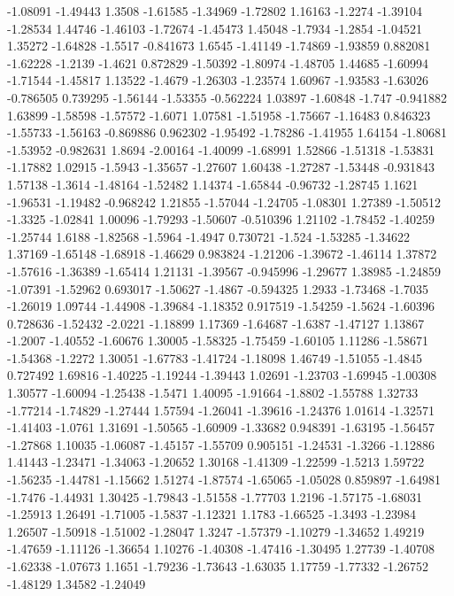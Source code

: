 \documentclass[9pt]{article}
\theoremstyle{plain}
\theoremstyle{definition}
\theoremstyle{remark}
\numberwithin{equation}{section}
\begin{document}
-1.08091
-1.49443
1.3508
-1.61585
-1.34969
-1.72802
1.16163
-1.2274
-1.39104
-1.28534
1.44746
-1.46103
-1.72674
-1.45473
1.45048
-1.7934
-1.2854
-1.04521
1.35272
-1.64828
-1.5517
-0.841673
1.6545
-1.41149
-1.74869
-1.93859
0.882081
-1.62228
-1.2139
-1.4621
0.872829
-1.50392
-1.80974
-1.48705
1.44685
-1.60994
-1.71544
-1.45817
1.13522
-1.4679
-1.26303
-1.23574
1.60967
-1.93583
-1.63026
-0.786505
0.739295
-1.56144
-1.53355
-0.562224
1.03897
-1.60848
-1.747
-0.941882
1.63899
-1.58598
-1.57572
-1.6071
1.07581
-1.51958
-1.75667
-1.16483
0.846323
-1.55733
-1.56163
-0.869886
0.962302
-1.95492
-1.78286
-1.41955
1.64154
-1.80681
-1.53952
-0.982631
1.8694
-2.00164
-1.40099
-1.68991
1.52866
-1.51318
-1.53831
-1.17882
1.02915
-1.5943
-1.35657
-1.27607
1.60438
-1.27287
-1.53448
-0.931843
1.57138
-1.3614
-1.48164
-1.52482
1.14374
-1.65844
-0.96732
-1.28745
1.1621
-1.96531
-1.19482
-0.968242
1.21855
-1.57044
-1.24705
-1.08301
1.27389
-1.50512
-1.3325
-1.02841
1.00096
-1.79293
-1.50607
-0.510396
1.21102
-1.78452
-1.40259
-1.25744
1.6188
-1.82568
-1.5964
-1.4947
0.730721
-1.524
-1.53285
-1.34622
1.37169
-1.65148
-1.68918
-1.46629
0.983824
-1.21206
-1.39672
-1.46114
1.37872
-1.57616
-1.36389
-1.65414
1.21131
-1.39567
-0.945996
-1.29677
1.38985
-1.24859
-1.07391
-1.52962
0.693017
-1.50627
-1.4867
-0.594325
1.2933
-1.73468
-1.7035
-1.26019
1.09744
-1.44908
-1.39684
-1.18352
0.917519
-1.54259
-1.5624
-1.60396
0.728636
-1.52432
-2.0221
-1.18899
1.17369
-1.64687
-1.6387
-1.47127
1.13867
-1.2007
-1.40552
-1.60676
1.30005
-1.58325
-1.75459
-1.60105
1.11286
-1.58671
-1.54368
-1.2272
1.30051
-1.67783
-1.41724
-1.18098
1.46749
-1.51055
-1.4845
0.727492
1.69816
-1.40225
-1.19244
-1.39443
1.02691
-1.23703
-1.69945
-1.00308
1.30577
-1.60094
-1.25438
-1.5471
1.40095
-1.91664
-1.8802
-1.55788
1.32733
-1.77214
-1.74829
-1.27444
1.57594
-1.26041
-1.39616
-1.24376
1.01614
-1.32571
-1.41403
-1.0761
1.31691
-1.50565
-1.60909
-1.33682
0.948391
-1.63195
-1.56457
-1.27868
1.10035
-1.06087
-1.45157
-1.55709
0.905151
-1.24531
-1.3266
-1.12886
1.41443
-1.23471
-1.34063
-1.20652
1.30168
-1.41309
-1.22599
-1.5213
1.59722
-1.56235
-1.44781
-1.15662
1.51274
-1.87574
-1.65065
-1.05028
0.859897
-1.64981
-1.7476
-1.44931
1.30425
-1.79843
-1.51558
-1.77703
1.2196
-1.57175
-1.68031
-1.25913
1.26491
-1.71005
-1.5837
-1.12321
1.1783
-1.66525
-1.3493
-1.23984
1.26507
-1.50918
-1.51002
-1.28047
1.3247
-1.57379
-1.10279
-1.34652
1.49219
-1.47659
-1.11126
-1.36654
1.10276
-1.40308
-1.47416
-1.30495
1.27739
-1.40708
-1.62338
-1.07673
1.1651
-1.79236
-1.73643
-1.63035
1.17759
-1.77332
-1.26752
-1.48129
1.34582
-1.24049
\end{document}
